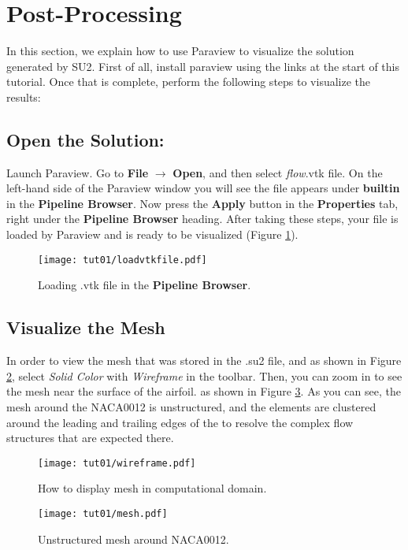 \section{Post-Processing}
In this section, we explain how to use Paraview to visualize the solution generated by SU2. First of all, install paraview using the links at the start of this tutorial. Once that is complete, perform the following steps to visualize the results:
\subsection{Open the Solution:}
Launch Paraview. Go to \textbf{File} $\rightarrow$ \textbf{Open}, and then select \textit{flow}.vtk file. On the left-hand side of the Paraview window you will see the file appears under \textbf{builtin} in the \textbf{Pipeline Browser}. Now press the \textbf{Apply} button in the \textbf{Properties} tab, right under the \textbf{Pipeline Browser} heading. After taking these steps, your file is loaded by Paraview and is ready to be visualized (Figure \ref{fig1:load}).
\begin{figure}[htbp]
    \centering
    \texttt{[image: tut01/loadvtkfile.pdf]}
    \caption{Loading .vtk file in the \textbf{Pipeline Browser}.}
    \label{fig1:load}
\end{figure}
\subsection{Visualize the Mesh}
In order to view the mesh that was stored in the .su2 file, and as shown in Figure \ref{fig1:wireframe}, select \textit{Solid Color} with \textit{Wireframe} in the toolbar. Then, you can zoom in to see the mesh near the surface of the airfoil. as shown in Figure \ref{fig1:mesh}. As you can see, the mesh around the NACA0012 is unstructured, and the elements are clustered around the leading and trailing edges of the to resolve the complex flow structures that are expected there.
\begin{figure}[htbp]
    \centering
    \texttt{[image: tut01/wireframe.pdf]}
    \caption{How to display mesh in computational domain.}
    \label{fig1:wireframe}
\end{figure}
\begin{figure}[htbp]
    \centering
    \texttt{[image: tut01/mesh.pdf]}
    \caption{Unstructured mesh around NACA0012.}
    \label{fig1:mesh}
\end{figure}

